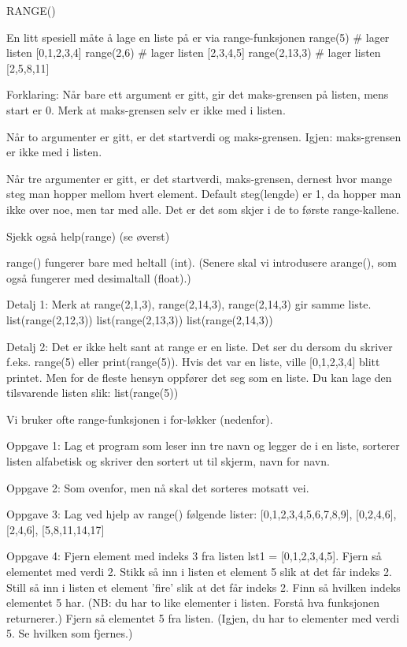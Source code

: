 RANGE()

En litt spesiell måte å lage en liste på er via range-funksjonen
range(5)        # lager listen [0,1,2,3,4]  
range(2,6)      # lager listen [2,3,4,5]
range(2,13,3)   # lager listen [2,5,8,11]

Forklaring: 
Når bare ett argument er gitt, gir det maks-grensen på listen, mens start er 0.
Merk at maks-grensen selv er ikke med i listen.

Når to argumenter er gitt, er det startverdi og maks-grensen.
Igjen: maks-grensen er ikke med i listen. 

Når tre argumenter er gitt, er det startverdi, maks-grensen, dernest hvor mange
steg man hopper mellom hvert element.
Default steg(lengde) er 1, da hopper man ikke over noe, men tar med alle.
Det er det som skjer i de to første range-kallene. 

Sjekk også 
help(range)
(se øverst) 



range() fungerer bare med heltall (int).
(Senere skal vi introdusere arange(), som også fungerer med desimaltall (float).) 


Detalj 1: Merk at range(2,1,3), range(2,14,3), range(2,14,3) gir samme liste. 
list(range(2,12,3))
list(range(2,13,3))
list(range(2,14,3))


Detalj 2: Det er ikke helt sant at range er en liste.
Det ser du dersom du skriver f.eks. range(5) eller print(range(5)).
Hvis det var en liste, ville [0,1,2,3,4] blitt printet. 
Men for de fleste hensyn oppfører det seg som en liste. 
Du kan lage den tilsvarende listen slik:
list(range(5))


Vi bruker ofte range-funksjonen i for-løkker (nedenfor). 




Oppgave 1: Lag et program som leser inn tre navn og legger de i en liste,
sorterer listen alfabetisk og skriver den sortert ut til skjerm, navn for navn. 


Oppgave 2: Som ovenfor, men nå skal det sorteres motsatt vei. 


Oppgave 3: Lag ved hjelp av range() følgende lister:
[0,1,2,3,4,5,6,7,8,9], [0,2,4,6], [2,4,6], [5,8,11,14,17] 


Oppgave 4: Fjern element med indeks 3 fra listen lst1 = [0,1,2,3,4,5].
Fjern så elementet med verdi 2.
Stikk så inn i listen et element 5 slik at det får indeks 2.
Still så inn i listen et element 'fire' slik at det får indeks 2.
Finn så hvilken indeks elementet 5 har.
(NB: du har to like elementer i listen. Forstå hva funksjonen returnerer.)
Fjern så elementet 5 fra listen.
(Igjen, du har to elementer med verdi 5. Se hvilken som fjernes.) 



